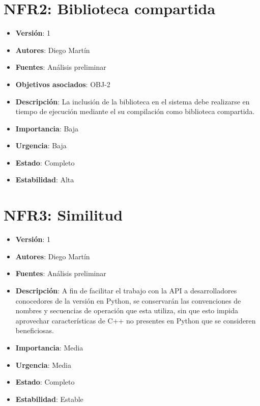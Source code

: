\documentclass[letterpaper,10pt,spanish]{sphinxmanual}
\begin{document}
\section{NFR2: Biblioteca compartida}
\label{analysis/nfr:nfr2-biblioteca-compartida}\begin{itemize}
\item {} 
\textbf{Versión}: 1

\item {} 
\textbf{Autores}: Diego Martín

\item {} 
\textbf{Fuentes}: Análisis preliminar

\item {} 
\textbf{Objetivos asociados}: OBJ-2

\item {} 
\textbf{Descripción}: La inclusión de la biblioteca en el sistema debe realizarse en tiempo de ejecución mediante el su compilación como biblioteca compartida.

\item {} 
\textbf{Importancia}: Baja

\item {} 
\textbf{Urgencia}: Baja

\item {} 
\textbf{Estado}: Completo

\item {} 
\textbf{Estabilidad}: Alta

\end{itemize}


\section{NFR3: Similitud}
\label{analysis/nfr:nfr3-similitud}\begin{itemize}
\item {} 
\textbf{Versión}: 1

\item {} 
\textbf{Autores}: Diego Martín

\item {} 
\textbf{Fuentes}: Análisis preliminar

\item {} 
\textbf{Descripción}: A fin de facilitar el trabajo con la API a desarrolladores conocedores de la versión en Python, se conservarán las convenciones de nombres y secuencias de operación que esta utiliza, sin que esto impida aprovechar características de C++ no presentes en Python que se consideren beneficiosas.

\item {} 
\textbf{Importancia}: Media

\item {} 
\textbf{Urgencia}: Media

\item {} 
\textbf{Estado}: Completo

\item {} 
\textbf{Estabilidad}: Estable

\end{itemize}
\end{document}
